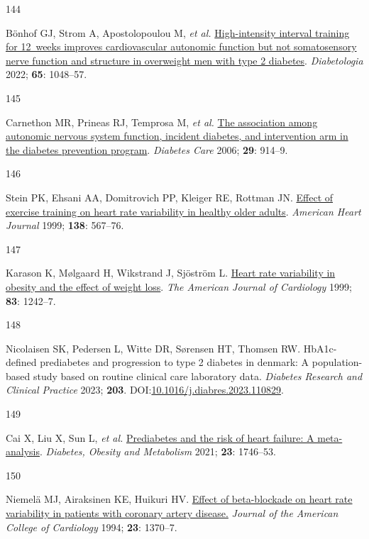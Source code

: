 \documentclass[
  letterpaper,
  headsepline=true,
  open=any]{scrbook}
\newlength{\cslhangindent}
\newlength{\csllabelwidth}
\newlength{\cslentryspacingunit} %
\newenvironment{CSLReferences}[2] %
 {%
  \setlength{\parindent}{0pt}
  \ifodd #1
  \let\oldpar\par
  \def\par{\hangindent=\cslhangindent\oldpar}
  \fi
  \setlength{\parskip}{#2\cslentryspacingunit}
 }%
 {}
\newcommand{\CSLLeftMargin}[1]{\parbox[t]{\csllabelwidth}{#1}}
\newcommand{\CSLRightInline}[1]{\parbox[t]{\linewidth - \csllabelwidth}{#1}\break}
\begin{document}
\begin{CSLReferences}{0}{0}
\leavevmode{}%
\CSLLeftMargin{144 }%
\CSLRightInline{Bönhof GJ, Strom A, Apostolopoulou M, \emph{et al.}
\href{https://doi.org/10.1007/s00125-022-05674-w}{High-intensity
interval training for 12~weeks improves cardiovascular autonomic
function but not somatosensory nerve function and structure in
overweight men with type 2 diabetes}. \emph{Diabetologia} 2022;
\textbf{65}: 1048--57.}

\leavevmode{}%
\CSLLeftMargin{145 }%
\CSLRightInline{Carnethon MR, Prineas RJ, Temprosa M, \emph{et al.}
\href{https://doi.org/10.2337/diacare.29.04.06.dc05-1729}{The
association among autonomic nervous system function, incident diabetes,
and intervention arm in the diabetes prevention program}. \emph{Diabetes
Care} 2006; \textbf{29}: 914--9.}

\leavevmode{}%
\CSLLeftMargin{146 }%
\CSLRightInline{Stein PK, Ehsani AA, Domitrovich PP, Kleiger RE, Rottman
JN. \href{https://doi.org/10.1016/S0002-8703(99)70162-6}{Effect of
exercise training on heart rate variability in healthy older adults}.
\emph{American Heart Journal} 1999; \textbf{138}: 567--76.}

\leavevmode{}%
\CSLLeftMargin{147 }%
\CSLRightInline{Karason K, Mølgaard H, Wikstrand J, Sjöström L.
\href{https://doi.org/10.1016/S0002-9149(99)00066-1}{Heart rate
variability in obesity and the effect of weight loss}. \emph{The
American Journal of Cardiology} 1999; \textbf{83}: 1242--7.}

\leavevmode{}%
\CSLLeftMargin{148 }%
\CSLRightInline{Nicolaisen SK, Pedersen L, Witte DR, Sørensen HT,
Thomsen RW. HbA1c-defined prediabetes and progression to type 2 diabetes
in denmark: A population-based study based on routine clinical care
laboratory data. \emph{Diabetes Research and Clinical Practice} 2023;
\textbf{203}.
DOI:\href{https://doi.org/10.1016/j.diabres.2023.110829}{10.1016/j.diabres.2023.110829}.}

\leavevmode{}%
\CSLLeftMargin{149 }%
\CSLRightInline{Cai X, Liu X, Sun L, \emph{et al.}
\href{https://doi.org/10.1111/dom.14388}{Prediabetes and the risk of
heart failure: A meta-analysis}. \emph{Diabetes, Obesity and Metabolism}
2021; \textbf{23}: 1746--53.}

\leavevmode{}%
\CSLLeftMargin{150 }%
\CSLRightInline{Niemelä MJ, Airaksinen KE, Huikuri HV.
\href{https://doi.org/10.1016/0735-1097(94)90379-4}{Effect of
beta-blockade on heart rate variability in patients with coronary artery
disease.} \emph{Journal of the American College of Cardiology} 1994;
\textbf{23}: 1370--7.}


\end{CSLReferences}
\end{document}
